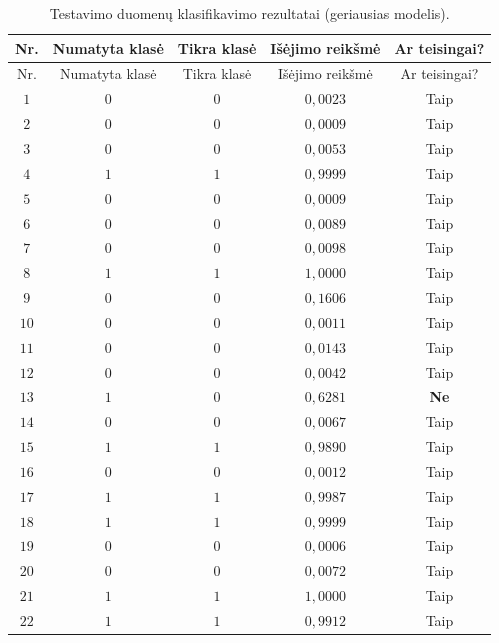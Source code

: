 \begin{longtable}{ccccc}
    \caption{Testavimo duomenų klasifikavimo rezultatai (geriausias modelis).}
    \label{tab:test_predictions} \\
    \toprule
    Nr. & Numatyta klasė & Tikra klasė & Išėjimo reikšmė & Ar teisingai? \\
    \midrule
    \endfirsthead
    
    \toprule
    Nr. & Numatyta klasė & Tikra klasė & Išėjimo reikšmė & Ar teisingai? \\
    \midrule
    \endhead
    
    \bottomrule
    \endfoot
    
    \bottomrule
    \endlastfoot

    $1$ & $0$ & $0$ & $0{,}0023$ & Taip \\
    $2$ & $0$ & $0$ & $0{,}0009$ & Taip \\
    $3$ & $0$ & $0$ & $0{,}0053$ & Taip \\
    $4$ & $1$ & $1$ & $0{,}9999$ & Taip \\
    $5$ & $0$ & $0$ & $0{,}0009$ & Taip \\
    $6$ & $0$ & $0$ & $0{,}0089$ & Taip \\
    $7$ & $0$ & $0$ & $0{,}0098$ & Taip \\
    $8$ & $1$ & $1$ & $1{,}0000$ & Taip \\
    $9$ & $0$ & $0$ & $0{,}1606$ & Taip \\
    $10$ & $0$ & $0$ & $0{,}0011$ & Taip \\
    $11$ & $0$ & $0$ & $0{,}0143$ & Taip \\
    $12$ & $0$ & $0$ & $0{,}0042$ & Taip \\
    $13$ & $1$ & $0$ & $0{,}6281$ & \textbf{Ne} \\
    $14$ & $0$ & $0$ & $0{,}0067$ & Taip \\
    $15$ & $1$ & $1$ & $0{,}9890$ & Taip \\
    $16$ & $0$ & $0$ & $0{,}0012$ & Taip \\
    $17$ & $1$ & $1$ & $0{,}9987$ & Taip \\
    $18$ & $1$ & $1$ & $0{,}9999$ & Taip \\
    $19$ & $0$ & $0$ & $0{,}0006$ & Taip \\
    $20$ & $0$ & $0$ & $0{,}0072$ & Taip \\
    $21$ & $1$ & $1$ & $1{,}0000$ & Taip \\
    $22$ & $1$ & $1$ & $0{,}9912$ & Taip \\

\end{longtable}
